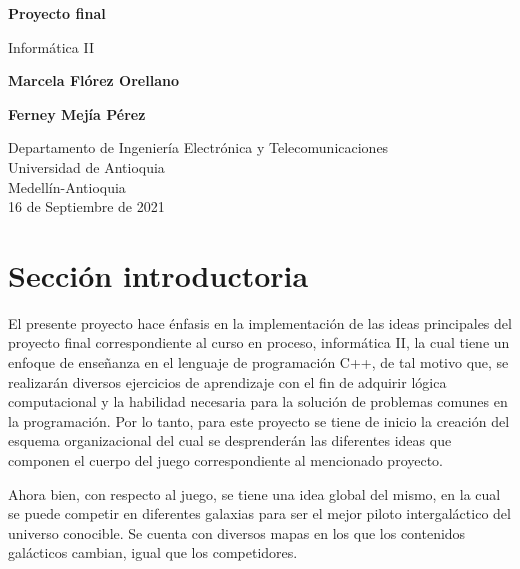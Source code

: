 \documentclass{article}
\begin{document}
\begin{titlepage}
    \begin{center}
        \vspace*{1cm}
            
        \Huge
        \textbf{Proyecto final}
            
        \vspace{0.5cm}
        \LARGE
        Informática II
            
            
        \vspace{1.5cm}
        
        \textbf{Marcela Flórez Orellano} 
        
        \vspace{0.3cm}
        \LARGE
        
        \textbf{Ferney Mejía Pérez}
            
        \vfill
            
        \vspace{0.8cm}
            
        \Large
        Departamento de Ingeniería Electrónica y Telecomunicaciones\\
        Universidad de Antioquia\\
        Medellín-Antioquia\\
        16 de Septiembre de 2021
         
            
    \end{center}
\end{titlepage}


\tableofcontents
\newpage


\section{Sección introductoria}\label{intro}
El presente proyecto hace énfasis en la implementación de las ideas principales del proyecto final correspondiente al curso en proceso, informática II, la cual tiene un enfoque de enseñanza en el lenguaje de programación C++, de tal motivo que, se realizarán diversos ejercicios de aprendizaje con el fin de adquirir lógica computacional y la habilidad necesaria para la solución de problemas comunes en la programación. Por lo tanto, para este proyecto se tiene de inicio la creación del esquema organizacional del cual se desprenderán las diferentes ideas que componen el cuerpo del juego correspondiente al mencionado proyecto.

Ahora bien, con respecto al juego, se tiene una idea global del mismo, en la cual se puede competir en diferentes galaxias para ser el mejor piloto intergaláctico del universo conocible. Se cuenta con diversos mapas en los que los contenidos galácticos cambian, igual que los competidores.  
\end{document}
